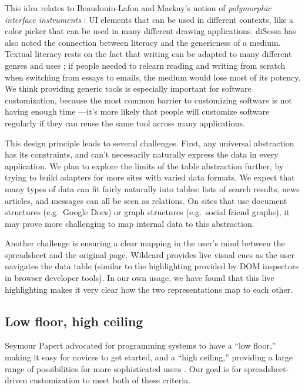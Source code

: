 \documentclass[english,submission]{programming}
\begin{document}
This idea relates to Beaudouin-Lafon and Mackay's notion of
\emph{polymorphic interface instruments} \autocite{beaudouin-lafon2000}:
UI elements that can be used in different contexts, like a color picker
that can be used in many different drawing applications. diSessa has
also noted the connection between literacy and the genericness of a
medium. Textual literacy rests on the fact that writing can be adapted
to many different genres and uses \autocite{disessa2000}; if people
needed to relearn reading and writing from scratch when switching from
essays to emails, the medium would lose most of its potency. We think
providing generic tools is especially important for software
customization, because the most common barrier to customizing software
is not having enough time \autocite{mackay1991}---it's more likely that
people will customize software regularly if they can reuse the same tool
across many applications.

This design principle leads to several challenges. First, any universal
abstraction has its constraints, and can't necessarily naturally express
the data in every application. We plan to explore the limits of the
table abstraction further, by trying to build adapters for more sites
with varied data formats. We expect that many types of data can fit
fairly naturally into tables: lists of search results, news articles,
and messages can all be seen as relations. On sites that use document
structures (e.g.~Google Docs) or graph structures (e.g.~social friend
graphs), it may prove more challenging to map internal data to this
abstraction.

Another challenge is ensuring a clear mapping in the user's mind between
the spreadsheet and the original page. Wildcard provides live visual
cues as the user navigates the data table (similar to the highlighting
provided by DOM inspectors in browser developer tools). In our own
usage, we have found that this live highlighting makes it very clear how
the two representations map to each other.

\hypertarget{low-floor-high-ceiling}{%
\subsection{Low floor, high ceiling}\label{low-floor-high-ceiling}}

Seymour Papert advocated for programming systems to have a ``low
floor,'' making it easy for novices to get started, and a ``high
ceiling,'' providing a large range of possibilities for more
sophisticated users \autocite{resnick2016}. Our goal is for
spreadsheet-driven customization to meet both of these criteria.
\end{document}
